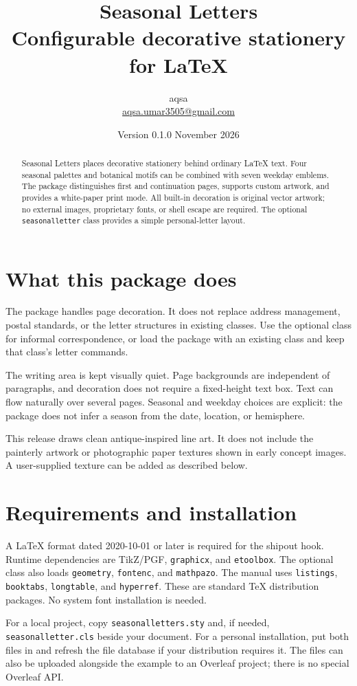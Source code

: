 \documentclass[11pt,a4paper]{article}
\title{Seasonal Letters\\\large Configurable decorative stationery for LaTeX}
\author{aqsa\\\small\href{mailto:aqsa.umar3505@gmail.com}{aqsa.umar3505@gmail.com}}
\date{Version 0.1.0\quad 5 November 2026}
\newcommand\key[1]{\texttt{#1}}
\begin{document}
\maketitle
\begin{abstract}
Seasonal Letters places decorative stationery behind ordinary LaTeX text.
Four seasonal palettes and botanical motifs can be combined with seven weekday
emblems. The package distinguishes first and continuation pages, supports
custom artwork, and provides a white-paper print mode. All built-in decoration
is original vector artwork; no external images, proprietary fonts, or shell
escape are required. The optional \key{seasonalletter} class provides a
simple personal-letter layout.
\end{abstract}
\tableofcontents
\section{What this package does}
The package handles page decoration. It does not replace address management,
postal standards, or the letter structures in existing classes. Use the
optional class for informal correspondence, or load the package with an
existing class and keep that class's letter commands.

The writing area is kept visually quiet. Page backgrounds are independent of
paragraphs, and decoration does not require a fixed-height text box. Text can
flow naturally over several pages. Seasonal and weekday choices are explicit:
the package does not infer a season from the date, location, or hemisphere.

This release draws clean antique-inspired line art. It does not include the
painterly artwork or photographic paper textures shown in early concept images.
A user-supplied texture can be added as described below.
\section{Requirements and installation}
A LaTeX format dated 2020-10-01 or later is required for the shipout hook.
Runtime dependencies are TikZ/PGF, \key{graphicx}, and \key{etoolbox}.
The optional class also loads \key{geometry}, \key{fontenc}, and
\key{mathpazo}. The manual uses \key{listings}, \key{booktabs},
\key{longtable}, and \key{hyperref}. These are standard TeX distribution
packages. No system font installation is needed.

For a local project, copy \key{seasonalletters.sty} and, if needed,
\key{seasonalletter.cls} beside your document. For a personal installation,
put both files in  and refresh the
file database if your distribution requires it. The files can also be uploaded
alongside the example to an Overleaf project; there is no special Overleaf API.
\end{document}
